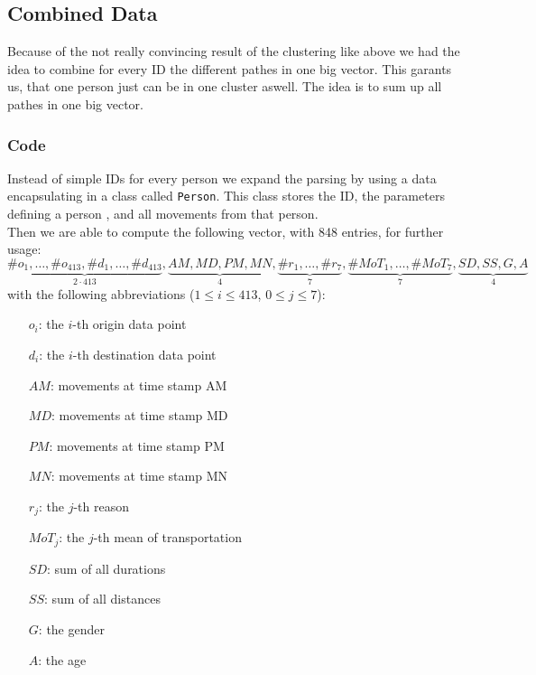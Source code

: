 \subsection{Combined Data}

Because of the not really convincing result of the clustering like above we had the idea to combine for every ID the different pathes in one big vector. This garants us, that one person just can be in one cluster aswell. The idea is to sum up all pathes in one big vector.
\subsubsection{Code}

Instead of simple IDs for every person we expand the parsing by using a data encapsulating in a class called \texttt{Person}. This class stores the ID, the parameters defining a person %
, and all movements from that person.\\
Then we are able to compute the following vector, with 848 entries, for further usage:
$$\underbrace{\#o_1, \dots, \#o_{413}, \#d_1, \dots, \#d_{413}}_{2\cdot 413} ,
 \underbrace{\mathit{AM}, \mathit{MD}, \mathit{PM}, \mathit{MN}}_{4}, 
 \underbrace{\#r_1, \dots, \#r_7}_{7}, 
 \underbrace{\#\mathit{MoT}_1, \dots, \#\mathit{MoT}_7}_{7}, 
 \underbrace{\mathit{SD}, \mathit{SS}, \mathit{G}, \mathit{A}}_{4}$$
with the following abbreviations ($1 \le i \le 413$, $0 \le j \le 7$):
\begin{multicols}{2}
\begin{itemize}
	\item[$o_i$:]  the $i$-th origin data point
	\item[$d_i$:]  the $i$-th destination data point
	\item[$\mathit{AM}$:] movements at time stamp AM
	\item[$\mathit{MD}$:] movements at time stamp MD
	\item[$\mathit{PM}$:] movements at time stamp PM
	\item[$\mathit{MN}$:] movements at time stamp MN
	\item[$r_j$:] the $j$-th reason
	\item[$\mathit{MoT}_j$:] the $j$-th mean of transportation
	\item[$\mathit{SD}$:] sum of all durations
	\item[$\mathit{SS}$:] sum of all distances
	\item[$\mathit{G}$:] the gender
	\item[$\mathit{A}$:] the age
\end{itemize}
\end{multicols}

